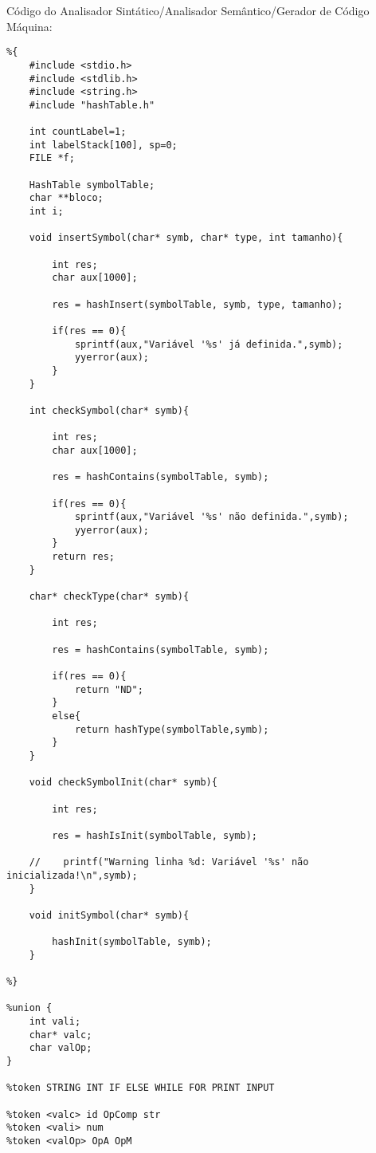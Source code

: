 \documentclass{report}
\begin{document}
Código do Analisador Sintático/Analisador Semântico/Gerador de Código Máquina:
\begin{verbatim}
%{
    #include <stdio.h>
    #include <stdlib.h>
    #include <string.h>
    #include "hashTable.h"

    int countLabel=1;
    int labelStack[100], sp=0;
    FILE *f;

    HashTable symbolTable;
    char **bloco;
    int i;

    void insertSymbol(char* symb, char* type, int tamanho){

        int res;
        char aux[1000];

        res = hashInsert(symbolTable, symb, type, tamanho);

        if(res == 0){
            sprintf(aux,"Variável '%s' já definida.",symb);
            yyerror(aux);
        }
    }

    int checkSymbol(char* symb){

        int res;
        char aux[1000];

        res = hashContains(symbolTable, symb);

        if(res == 0){
            sprintf(aux,"Variável '%s' não definida.",symb);
            yyerror(aux);
        }
        return res;
    }

    char* checkType(char* symb){

        int res;

        res = hashContains(symbolTable, symb);

        if(res == 0){
            return "ND";
        }
        else{
            return hashType(symbolTable,symb);
        }
    }

    void checkSymbolInit(char* symb){

        int res;

        res = hashIsInit(symbolTable, symb);

    //    printf("Warning linha %d: Variável '%s' não inicializada!\n",symb);
    }

    void initSymbol(char* symb){

        hashInit(symbolTable, symb);
    }

%}

%union {
    int vali;
    char* valc;
    char valOp;
}

%token STRING INT IF ELSE WHILE FOR PRINT INPUT 

%token <valc> id OpComp str
%token <vali> num
%token <valOp> OpA OpM


\end{verbatim}
\end{document}
